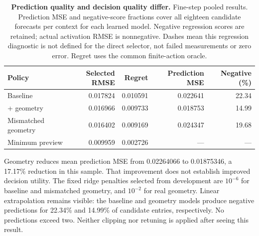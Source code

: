 \begin{table}[H]
\centering\small
\begin{tabular}{lrrrr}
\toprule
Policy & Selected RMSE & Regret & Prediction MSE & Negative (\%) \\
\midrule
Baseline & 0.017824 & 0.010591 & 0.022641 & 22.34 \\
+ geometry & 0.016966 & 0.009733 & 0.018753 & 14.99 \\
Mismatched geometry & 0.016402 & 0.009169 & 0.024347 & 19.68 \\
Minimum preview & 0.009959 & 0.002726 & --- & --- \\
\bottomrule
\end{tabular}
\caption{\textbf{Prediction quality and decision quality differ.} Fine-step pooled results. Prediction MSE and negative-score fractions cover all eighteen candidate forecasts per context for each learned model. Negative regression scores are retained; actual activation RMSE is nonnegative. Dashes mean this regression diagnostic is not defined for the direct selector, not failed measurements or zero error. Regret uses the common finite-action oracle.}
\label{tab:information-prediction}
\end{table}
Geometry reduces mean prediction MSE from 0.02264066 to 0.01875346, a 17.17\% reduction in this sample. That improvement does not establish improved decision utility. The fixed ridge penalties selected from development are $10^{-6}$ for baseline and mismatched geometry, and $10^{-2}$ for real geometry. Linear extrapolation remains visible: the baseline and geometry models produce negative predictions for 22.34\% and 14.99\% of candidate entries, respectively. No predictions exceed two. Neither clipping nor retuning is applied after seeing this result.

